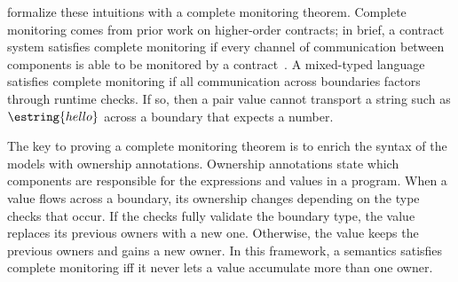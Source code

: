 \citet{gfd-oopsla-2019} formalize these intuitions with a complete
 monitoring theorem.
Complete monitoring comes from prior work on higher-order contracts;
 in brief, a contract system satisfies complete monitoring if every channel
 of communication between components is able to be monitored
 by a contract~\cite{dtf-esop-2012}.
A mixed-typed language satisfies complete monitoring if all communication
 across boundaries factors through runtime checks.
If so, then a pair value cannot transport a string such as $\estring{hello}$
 across a boundary that expects a number.

The key to proving a complete monitoring theorem is to enrich the syntax of
 the models with ownership annotations.
Ownership annotations state which components are responsible for the
 expressions and values in a program.
When a value flows across a boundary, its ownership changes depending on
 the type checks that occur.
If the checks fully validate the boundary type, the value replaces its previous
 owners with a new one.
Otherwise, the value keeps the previous owners and gains a new owner.
In this framework, a semantics satisfies complete monitoring iff it never
 lets a value accumulate more than one owner.




